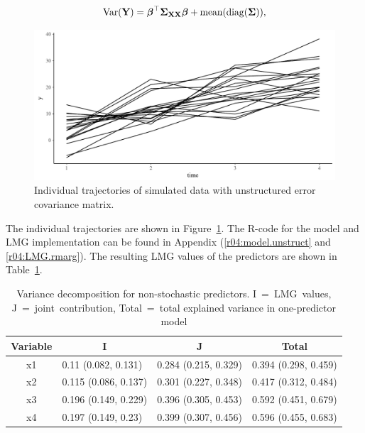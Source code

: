 \documentclass[11pt,a4paper,twoside]{book}\usepackage[]{graphicx}\usepackage[]{color}
\newenvironment{knitrout}{}{} %
\begin{document}
      \begin{align} 
        \operatorname{Var}({\mathbf{Y}}) = {\boldsymbol{\beta}}^\top {\boldsymbol{\Sigma}}{}_{{\mathbf{X}} {\mathbf{X}}}  {\boldsymbol{\beta}} + \text{mean}(\operatorname{diag}({\boldsymbol{\Sigma}}{})),
   \end{align}



\begin{knitrout}
\color{fgcolor}\begin{figure}

{\centering \includegraphics[width=\textwidth-3cm]{figure/ch04_figsimdata_repeated_unstruct_plot-1} 

}

\caption[Individual trajectories of simulated data with unstructured error covariance matrix]{Individual trajectories of simulated data with unstructured error covariance matrix.}\label{fig:simdata.repeated.unstruct.plot}
\end{figure}


\end{knitrout}




The individual trajectories are shown in Figure~\ref{fig:simdata.repeated.unstruct.plot}. The R-code for the model and LMG implementation can be found in Appendix (\ref{r04:model.unstruct} and  \ref{r04:LMG.rmarg}). The resulting LMG values of the predictors are shown in Table~\ref{tbl:repeated.unstructured}.

\begin{table}[h]
\caption{Variance decomposition for non-stochastic predictors. I~=~LMG~values, J~=~joint~contribution, Total~=~total explained variance in one-predictor model}
\centering
\begin{tabular}{clll}
  \toprule
  \multicolumn{1}{c}{\textbf{Variable}} & \multicolumn{1}{c}{\textbf{I}} &\multicolumn{1}{c}{\textbf{J}} & \multicolumn{1}{c}{\textbf{Total}} \\
  \hline
x1 & 0.11 (0.082, 0.131)  & 0.284 (0.215, 0.329)   & 0.394 (0.298, 0.459)  \\ 
x2 & 0.115 (0.086, 0.137)  & 0.301 (0.227, 0.348)   & 0.417 (0.312, 0.484)  \\ 
x3 & 0.196 (0.149, 0.229)  & 0.396 (0.305, 0.453)   & 0.592 (0.451, 0.679)  \\ 
x4 & 0.197 (0.149, 0.23)  & 0.399 (0.307, 0.456)   & 0.596 (0.455, 0.683)  \\ 
   \bottomrule
\end{tabular}
\label{tbl:repeated.unstructured}
\end{table}
\end{document}
